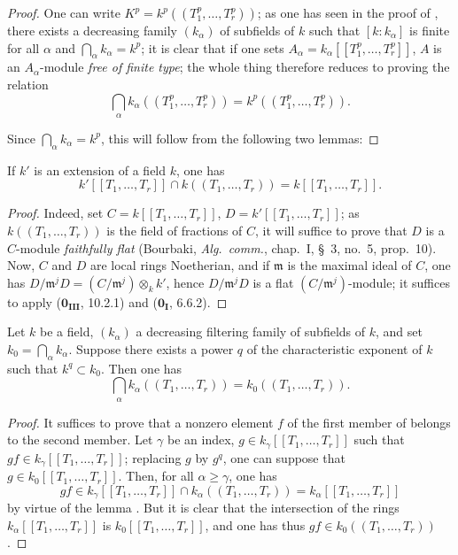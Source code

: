 \begin{proof}
One can write $K^p=k^p((T_1^p,\ldots,T_r^p))$; as one has seen in the proof of , there exists a decreasing family $(k_\alpha)$ of subfields of $k$ such that $[k:k_\alpha]$ is finite for all $\alpha$ and $\bigcap_\alpha k_\alpha=k^p$; it is clear that if one sets $A_\alpha=k_\alpha[[T_1^p,\ldots,T_r^p]]$, $A$ is an $A_\alpha$-module \emph{free of finite type}; the whole thing therefore reduces to proving the relation
\begin{equation}
\tag{21.8.8.1}
  \label{0.21.8.8.1}
  \bigcap_\alpha k_\alpha((T_1^p,\ldots,T_r^p))=k^p((T_1^p,\ldots,T_r^p)).
\end{equation}

Since $\bigcap_\alpha k_\alpha=k^p$, this will follow from the following two lemmas:
\end{proof}

\begin{lemma}[21.8.8.2]
\label{0.21.8.8.2}
If $k'$ is an extension of a field $k$, one has
\[
  k'[[T_1,\ldots,T_r]]\cap k((T_1,\ldots,T_r))=k[[T_1,\ldots,T_r]].
\]
\end{lemma}

\begin{proof}
Indeed, set $C=k[[T_1,\ldots,T_r]]$, $D=k'[[T_1,\ldots,T_r]]$; as $k((T_1,\ldots,T_r))$ is the field of fractions of $C$, it will suffice to prove that $D$ is a $C$-module \emph{faithfully flat} (Bourbaki, \emph{Alg.\ comm.}, chap.~I, \S~3, no.~5, prop.~10).
Now, $C$ and $D$ are local rings Noetherian, and if $\mathfrak{m}$ is the maximal ideal of $C$, one has $D/\mathfrak{m}^j D=(C/\mathfrak{m}^j)\otimes_k k'$, hence $D/\mathfrak{m}^j D$ is a flat $(C/\mathfrak{m}^j)$-module; it suffices to apply ($\mathbf{0_{III}}$, 10.2.1) and ($\mathbf{0_I}$, 6.6.2).
\end{proof}

\begin{lemma}[21.8.8.3]
\label{0.21.8.8.3}
Let $k$ be a field, $(k_\alpha)$ a decreasing filtering family of subfields of $k$, and set $k_0=\bigcap_\alpha k_\alpha$.
Suppose there exists a power $q$ of the characteristic exponent of $k$ such that $k^q\subset k_0$.
Then one has
\begin{equation}
\tag{21.8.8.4}
  \label{0.21.8.8.4}
  \bigcap_\alpha k_\alpha((T_1,\ldots,T_r))=k_0((T_1,\ldots,T_r)).
\end{equation}
\end{lemma}

\begin{proof}
It suffices to prove that a nonzero element $f$ of the first member of  belongs to the second member.
Let $\gamma$ be an index, $g\in k_\gamma[[T_1,\ldots,T_r]]$ such that $gf\in k_\gamma[[T_1,\ldots,T_r]]$; replacing $g$ by $g^q$, one can suppose that $g\in k_0[[T_1,\ldots,T_r]]$.
Then, for all $\alpha\geqslant\gamma$, one has
\[
  gf\in k_\gamma[[T_1,\ldots,T_r]]\cap k_\alpha((T_1,\ldots,T_r))=k_\alpha[[T_1,\ldots,T_r]]
\]
by virtue of the lemma .
But it is clear that the intersection of the rings $k_\alpha[[T_1,\ldots,T_r]]$ is $k_0[[T_1,\ldots,T_r]]$, and one has thus $gf\in k_0((T_1,\ldots,T_r))$.
\end{proof}

